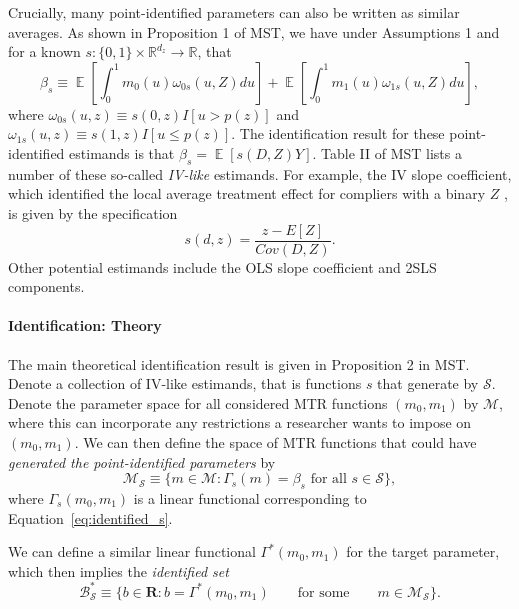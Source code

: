 \documentclass[12pt,a4paper,english]{article} %
\DeclareMathOperator*{\E}{\mathbb{E}}
\numberwithin{equation}{section}
\theoremstyle{definition}
\theoremstyle{remark}
\theoremstyle{plain}
\begin{document}
Crucially, many point-identified parameters can also be written as similar averages.
As shown in Proposition 1 of MST, we have under Assumptions 1 and for a known $s: \{0,1\}\times \mathbb{R}^{d_z} \to \mathbb{R}$, that
\begin{equation}\label{eq:identified_s}
  \beta_s \equiv \E\left[\int_0^1m_0(u)\omega_{0s}(u,Z)du\right] + \E\left[\int_0^1m_1(u)\omega_{1s}(u,Z)du\right],
\end{equation}
where $\omega_{0s}(u,z) \equiv s(0, z)I[u > p(z)]$ and $\omega_{1s}(u,z) \equiv s(1,z) I[u\leq p(z)]$.
The identification result for these point-identified estimands is that $\beta_s = \E[s(D,Z)Y]$.
Table II of MST lists a number of these so-called \textit{IV-like} estimands.
For example, the IV slope coefficient, which identified the local average treatment effect for compliers with a binary $Z$ \citep{imbens_angrist1994ecma}, is given by the specification
\begin{equation*}
  s(d,z) = \frac{z - E[Z]}{Cov(D,Z)}.
\end{equation*}
Other potential estimands include the OLS slope coefficient and 2SLS components.

\paragraph{Identification: Theory}
The main theoretical identification result is given in Proposition 2 in MST.\@
Denote a collection of IV-like estimands, that is functions $s$ that generate by $\mathcal{S}$.
Denote the parameter space for all considered MTR functions $(m_0, m_1)$ by $\mathcal{M}$, where this can incorporate any restrictions a researcher wants to impose on $(m_0, m_1)$.
We can then define the space of MTR functions that could have \textit{generated the point-identified parameters} by
\begin{equation*}
  \mathcal{M}_{\mathcal{S}} \equiv \{m\in \mathcal{M}: \Gamma_s(m) = \beta_s \text{ for all } s\in\mathcal{S}\},
\end{equation*}
where $\Gamma_s(m_0, m_1)$ is a linear functional corresponding to Equation~\ref{eq:identified_s}.

We can define a similar linear functional $\Gamma^*(m_0, m_1)$ for the target parameter, which then implies the \textit{identified set}
\begin{equation}\label{eq:identified_set}
  \mathcal{B}^*_\mathcal{S} \equiv \{b\in\mathbf{R}: b = \Gamma^*(m_0, m_1) \qquad \text{for some} \qquad m \in \mathcal{M}_\mathcal{S}\}.
\end{equation}
\end{document}
